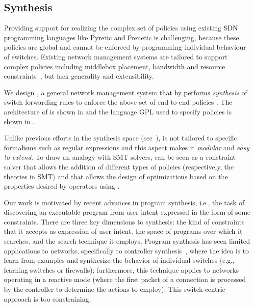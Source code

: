 \subsection{Synthesis} \label{sec:synthesis} 


Providing support for realizing the complex set of policies using
existing SDN programming languages like Pyretic and Frenetic is
challenging, because these policies are global and cannot be enforced
by programming individual behaviour of switches. Existing network
management systems are tailored to support complex policies including
middlebox placement, bandwidth and resource constraints~\cite{simple,merlin,oneswitch},
but lack generality and
extensibility.

We design \name, a general network management system that 
by performs {\em synthesis} of switch forwarding
rules to enforce the above set of end-to-end policies . The architecture of \name
is shown in  and the 
language GPL used to specify policies
is shown in .

Unlike previous efforts in the synthesis space (see~\cite{netgen,merlin}), \Name is
not tailored to specific formalisms such as regular expressions and
this aspect makes it {\em modular} and {\em easy to extend}.
To draw an analogy with SMT solvers, \Name can be seen as a constraint
solver that allows the addition of different types of policies
(respectively, the theories in SMT) and that allows the design of
optimizations based on the properties desired by 
  operators using \Name. 
  
Our work is motivated by recent advances in program synthesis, i.e.,
the task of discovering an executable
program from user intent expressed in the form of some
constraints. There are three key dimensions to synthesis: the kind of
constraints that it accepts as expression of user intent, the space of
programs over which it searches, and the search technique it
employs. Program synthesis has seen limited applications to networks,
specifically to controller synthesis~\cite{netegg}, where the idea is
to learn from examples and synthesize the behavior of individual
switches (e.g., learning switches or firewalls); furthermore, this
technique applies to networks operating in a reactive mode (where the
first packet of a connection is processed by the controller to
determine the actions to employ). This switch-centric approach is too constraining.

